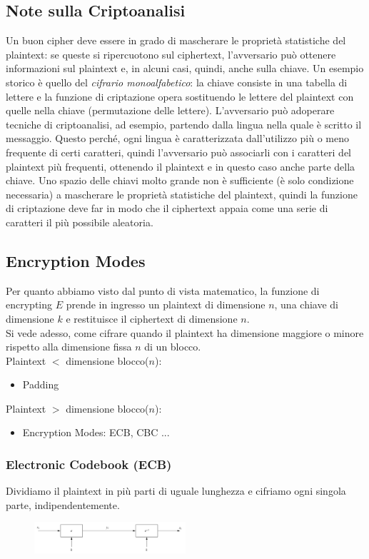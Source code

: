 \documentclass[a4paper,12pt]{article}
\begin{document}
\subsection{Note sulla Criptoanalisi}
Un buon cipher deve essere in grado di mascherare le proprietà statistiche del plaintext: se queste si ripercuotono sul ciphertext, l'avversario può ottenere informazioni sul plaintext e, in alcuni casi, quindi, anche sulla chiave.
Un esempio storico è quello del \textit{cifrario monoalfabetico}: la chiave consiste in una tabella di lettere e la funzione di criptazione opera sostituendo le lettere del plaintext con quelle nella chiave (permutazione delle lettere). 
L'avversario può adoperare tecniche di criptoanalisi, ad esempio, partendo dalla lingua nella quale è scritto il messaggio. 
Questo perché, ogni lingua è caratterizzata dall'utilizzo più o meno frequente di certi caratteri, quindi l'avversario può associarli con i caratteri del plaintext più frequenti, ottenendo il plaintext e in questo caso anche parte della chiave.
Uno spazio delle chiavi molto grande non è sufficiente (è solo condizione necessaria) a mascherare le proprietà statistiche del plaintext, quindi la funzione di criptazione deve far in modo che il ciphertext appaia come una serie di caratteri il più possibile aleatoria.

\subsection{Encryption Modes}
Per quanto abbiamo visto dal punto di vista matematico, la funzione di encrypting $E$ prende in ingresso un plaintext di dimensione $n$, una chiave di dimensione $k$ e restituisce il ciphertext di dimensione $n$. \\
Si vede adesso, come cifrare quando il plaintext ha dimensione maggiore o minore rispetto alla dimensione fissa $n$ di un blocco. \\
Plaintext $<$ dimensione blocco($n$):
\begin{itemize}
	\item Padding
\end{itemize}
Plaintext $>$ dimensione blocco($n$):
\begin{itemize}
	\item Encryption Modes: ECB, CBC ...
\end{itemize}
\subsubsection{Electronic Codebook (ECB)}
Dividiamo il plaintext in più parti di uguale lunghezza e cifriamo ogni singola parte, indipendentemente.
\begin{figure}[H]
  \centering
  \includegraphics[width=0.5\textwidth]{img/ecb}
\end{figure}
\end{document}
